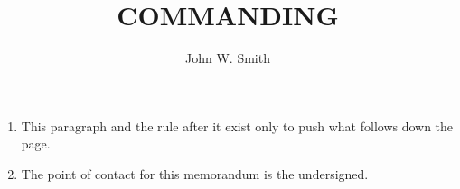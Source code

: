 \documentclass{../armymemo}
\author{John W. Smith}\rank{CPT}\branch{CY}
\title{COMMANDING}
\begin{document}
\begin{enumerate}
	\item This paragraph and the rule after it exist only to push what follows down
	      the page.\rule[-5.0in]{0pt}{0pt}
	\item The point of contact for this memorandum is the undersigned.
\end{enumerate}
\end{document}
